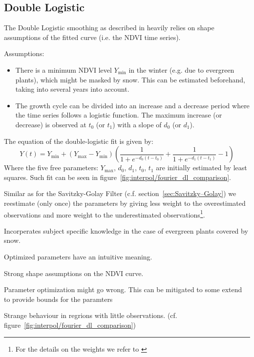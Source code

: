 \subsection{Double Logistic}
\label{sec:double_logistic}
The Double Logistic smoothing as described in \cite{beckImprovedMonitoringVegetation2006} heavily relies on shape assumptions of the fitted curve (i.e. the NDVI time series).

Assumptions:
\begin{itemize}
  \item There is a minimum NDVI level $Y_{\min}$ in the winter (e.g. due to evergreen plants), which might be masked by snow. This can be estimated beforehand, taking into several years into account.
  \item The growth cycle can be divided into an increase and a decrease period where the time series follows a logistic function. The maximum increase (or decrease) is observed at $t_0$ (or $t_1$) with a slope of $d_0$ (or $d_1$).
\end{itemize}

The equation of the double-logistic fit is given by:
\begin{equation*}
  Y(t) = Y_{\min} + \left(Y_{\max}-Y_{\min}\right)\left(\frac{1}{1+e^{-d_0(t-t_0)}}+\frac{1}{1+e^{-d_1(t-t_1)}}-1\right)
\end{equation*}
Where the five free parameters: $Y_{\max}$, $d_0$, $d_1$, $t_0$, $t_1$ are initially estimated by least squares. Such fit can be seen in figure~\ref{fig:interpol/fourier_dl_comparison}.

Similar as for the Savitzky-Golay Filter (c.f. section~\ref{sec:Savitzky–Golay}) we reestimate (only once) the parameters by giving less weight to the overestimated observations and more weight to the underestimated observations\footnote{For the details on the weights we refer to \cite{beckImprovedMonitoringVegetation2006}}.

\begin{my_pros_cons_table}{
    \item Incorperates subject specific knowledge in the case of evergreen plants covered by snow.
    \item Optimized parameters have an intuitive meaning.
  }{
    \item Strong shape assumptions on the NDVI curve.
    \item Parameter optimization might go wrong. This can be mitigated to some extend to provide bounds for the paramters
    \item Strange behaviour in regrions with little observations. (cf. figure~\ref{fig:interpol/fourier_dl_comparison})
  }
\end{my_pros_cons_table}


